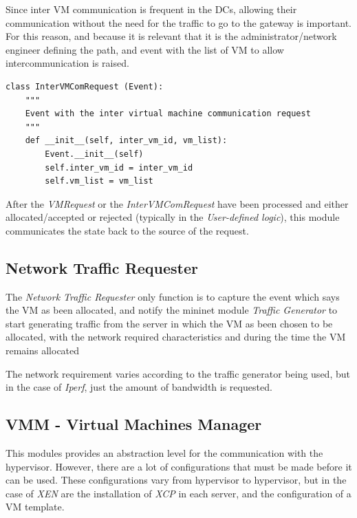 \documentclass[12pt,english,oneside]{book}
\begin{document}
Since inter VM communication is frequent in the DCs, allowing their communication without the need for the traffic to go to the gateway is important. For this reason, and because it is relevant that it is the administrator/network engineer defining the path, and event with the list of VM to allow intercommunication is raised.

\begin{verbatim}
class InterVMComRequest (Event):
    """
    Event with the inter virtual machine communication request
    """
    def __init__(self, inter_vm_id, vm_list):
        Event.__init__(self)
        self.inter_vm_id = inter_vm_id
        self.vm_list = vm_list
\end{verbatim}

After the \textit{VMRequest} or the \textit{InterVMComRequest} have been processed and either allocated/accepted or rejected (typically in the \textit{User-defined logic}), this module communicates the state back to the source of the request.

\subsection{Network Traffic Requester}
\hspace{0.6cm}

The \textit{Network Traffic Requester} only function is to capture the event which says the VM as been allocated, and notify the mininet module \textit{Traffic Generator} to start generating traffic from the server in which the VM as been chosen to be allocated, with the network required characteristics and during the time the VM remains allocated

The network requirement varies according to the traffic generator being used, but in the case of \textit{Iperf}, just the amount of bandwidth is requested.

\subsection{VMM - Virtual Machines Manager}
\hspace{0.6cm}

This modules provides an abstraction level for the communication with the hypervisor. However, there are a lot of configurations that must be made before it can be used. These configurations vary from hypervisor to hypervisor, but in the case of \textit{XEN} are the installation of \textit{XCP} in each server, and the configuration of a VM template.
\end{document}
